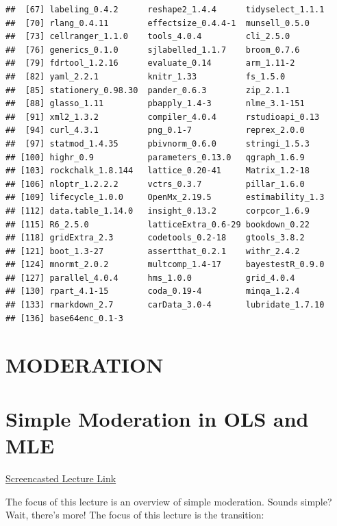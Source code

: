 \documentclass[
  english,
]{book}
\begin{document}
\begin{verbatim}
##  [67] labeling_0.4.2      reshape2_1.4.4      tidyselect_1.1.1   
##  [70] rlang_0.4.11        effectsize_0.4.4-1  munsell_0.5.0      
##  [73] cellranger_1.1.0    tools_4.0.4         cli_2.5.0          
##  [76] generics_0.1.0      sjlabelled_1.1.7    broom_0.7.6        
##  [79] fdrtool_1.2.16      evaluate_0.14       arm_1.11-2         
##  [82] yaml_2.2.1          knitr_1.33          fs_1.5.0           
##  [85] stationery_0.98.30  pander_0.6.3        zip_2.1.1          
##  [88] glasso_1.11         pbapply_1.4-3       nlme_3.1-151       
##  [91] xml2_1.3.2          compiler_4.0.4      rstudioapi_0.13    
##  [94] curl_4.3.1          png_0.1-7           reprex_2.0.0       
##  [97] statmod_1.4.35      pbivnorm_0.6.0      stringi_1.5.3      
## [100] highr_0.9           parameters_0.13.0   qgraph_1.6.9       
## [103] rockchalk_1.8.144   lattice_0.20-41     Matrix_1.2-18      
## [106] nloptr_1.2.2.2      vctrs_0.3.7         pillar_1.6.0       
## [109] lifecycle_1.0.0     OpenMx_2.19.5       estimability_1.3   
## [112] data.table_1.14.0   insight_0.13.2      corpcor_1.6.9      
## [115] R6_2.5.0            latticeExtra_0.6-29 bookdown_0.22      
## [118] gridExtra_2.3       codetools_0.2-18    gtools_3.8.2       
## [121] boot_1.3-27         assertthat_0.2.1    withr_2.4.2        
## [124] mnormt_2.0.2        multcomp_1.4-17     bayestestR_0.9.0   
## [127] parallel_4.0.4      hms_1.0.0           grid_4.0.4         
## [130] rpart_4.1-15        coda_0.19-4         minqa_1.2.4        
## [133] rmarkdown_2.7       carData_3.0-4       lubridate_1.7.10   
## [136] base64enc_0.1-3
\end{verbatim}

\hypertarget{MOD}{%
\chapter*{MODERATION}\label{MOD}}

\hypertarget{SimpMod}{%
\chapter{Simple Moderation in OLS and MLE}\label{SimpMod}}

\href{https://spu.hosted.panopto.com/Panopto/Pages/Viewer.aspx?pid=cc098142-3693-4366-bb55-ad1d0175414e}{Screencasted Lecture Link}

The focus of this lecture is an overview of simple moderation. Sounds simple? Wait, there's more! The focus of this lecture is the transition:
\end{document}
